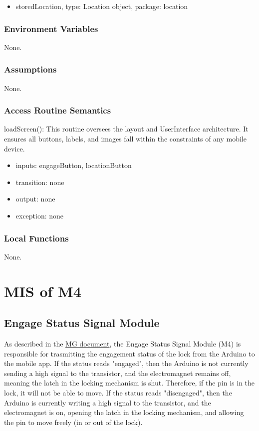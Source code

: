 \documentclass[12pt, titlepage]{article}
\begin{document}
\begin{itemize}
\item storedLocation, type: Location object, package: location
\end{itemize}


\subsubsection{Environment Variables}

None.


\subsubsection{Assumptions}

None.

\subsubsection{Access Routine Semantics}

\noindent loadScreen():
This routine oversees the layout and UserInterface architecture. It ensures all buttons, labels, and images fall within the constraints of any mobile device. 
\begin{itemize}
\item inputs: engageButton, locationButton
\item transition: none
\item output: none
\item exception: none
\end{itemize}

\subsubsection{Local Functions}

None.





\section{MIS of M4} \label{EngageStatus} 

\subsection{Engage Status Signal Module}

As described in the \href{https://github.com/NevoAbigail/Capstone/blob/main/docs/Design/SoftArchitecture/MG.pdf}{MG document}, the Engage Status Signal Module (M4) is responsible for trasmitting the engagement status of the lock from the Arduino to the mobile app. If the status reads "engaged", then the Arduino is not currently sending a high signal to the transistor, and the electromagnet remains off, meaning the latch in the locking mechanism is shut. Therefore, if the pin is in the lock, it will not be able to move. If the status reads "disengaged", then the Arduino is currently writing a high signal to the transistor, and the electromagnet is on, opening the latch in the locking mechanism, and allowing the pin to move freely (in or out of the lock). 
\end{document}
